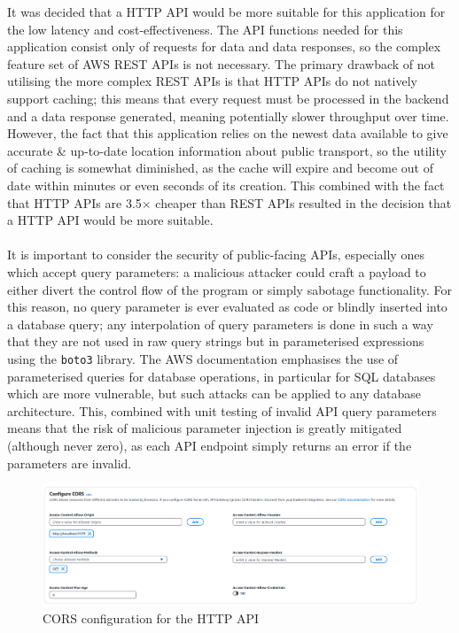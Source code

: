 \documentclass[a4paper,11pt]{report}
\begin{document}
It was decided that a HTTP API would be more suitable for this application for the low latency and cost-effectiveness.
The API functions needed for this application consist only of requests for data and data responses, so the complex feature set of AWS REST APIs is not necessary.
The primary drawback of not utilising the more complex REST APIs is that HTTP APIs do not natively support caching;
this means that every request must be processed in the backend and a data response generated, meaning potentially slower throughput over time.
However, the fact that this application relies on the newest data available to give accurate \& up-to-date location information about public transport, so the utility of caching is somewhat diminished, as the cache will expire and become out of date within minutes or even seconds of its creation.
This combined with the fact that HTTP APIs are 3.5$\times$ cheaper\supercite{apipricing} than REST APIs resulted in the decision that a HTTP API would be more suitable.
\\\\
It is important to consider the security of public-facing APIs, especially ones which accept query parameters: a malicious attacker could craft a payload to either divert the control flow of the program or simply sabotage functionality.
For this reason, no query parameter is ever evaluated as code or blindly inserted into a database query;
any interpolation of query parameters is done in such a way that they are not used in raw query strings but in parameterised expressions using the \texttt{boto3} library\supercite{boto3query}.
The AWS documentation emphasises the use of parameterised queries for database operations, in particular for SQL databases which are more vulnerable, but such attacks can be applied to any database architecture\supercite{useparameterisedqueries}. 
This, combined with unit testing of invalid API query parameters means that the risk of malicious parameter injection is greatly mitigated (although never zero), as each API endpoint simply returns an error if the parameters are invalid.

\begin{figure}[H]
    \centering
    \includegraphics[width=\textwidth]{./images/api_cors_configuration.png}
    \caption{CORS configuration for the HTTP API}
\end{figure}
\end{document}
